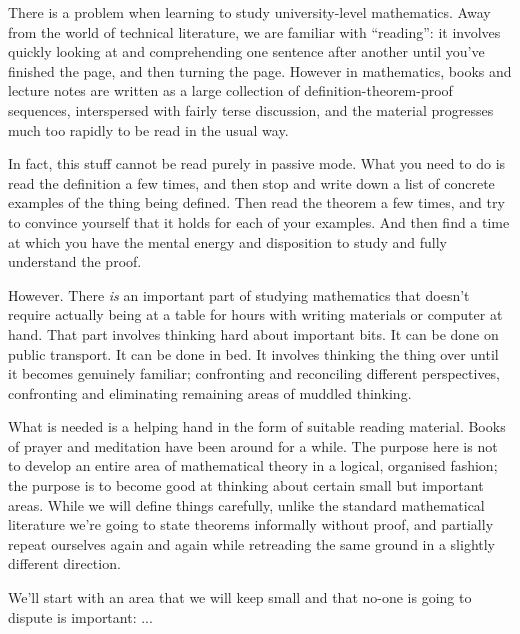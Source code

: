 \begin{lemma}
{There is a problem when learning to study university-level mathematics. Away from the world of
technical literature, we are familiar with ``reading'': it involves quickly looking at and
comprehending one sentence after another until you've finished the page, and then turning the
page. However in mathematics, books and lecture notes are written as a large collection of
definition-theorem-proof sequences, interspersed with fairly terse discussion, and the material
progresses much too rapidly to be read in the usual way.

In fact, this stuff cannot be read purely in passive mode.  What you need to do is read the
definition a few times, and then stop and write down a list of concrete examples of the thing being
defined. Then read the theorem a few times, and try to convince yourself that it holds for each of
your examples. And then find a time at which you have the mental energy and disposition to study
and fully understand the proof.

However. There {\it is} an important part of studying mathematics that doesn't require actually
being at a table for hours with writing materials or computer at hand. That part involves thinking
hard about important bits. It can be done on public transport. It can be done in bed. It involves
thinking the thing over until it becomes genuinely familiar; confronting and reconciling different
perspectives, confronting and eliminating remaining areas of muddled thinking.

What is needed is a helping hand in the form of suitable reading material. Books of prayer and
meditation have been around for a while.  The purpose here is not to develop an entire area of
mathematical theory in a logical, organised fashion; the purpose is to become good at thinking
about certain small but important areas. While we will define things carefully, unlike the standard
mathematical literature we're going to state theorems informally without proof, and partially
repeat ourselves again and again while retreading the same ground in a slightly different
direction.

We'll start with an area that we will keep small and that no-one is going to dispute is important:
...


}
\end{lemma}
